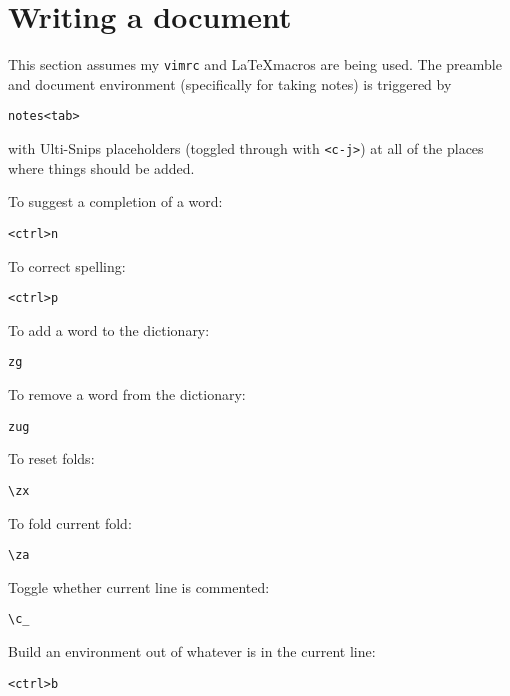 \documentclass{amsart}
\begin{document}
\section{Writing a document}

This section assumes my \texttt{vimrc} and \LaTeX macros are being used.
The preamble and document environment (specifically for taking notes) is triggered by
\begin{verbatim}
notes<tab>
\end{verbatim}
with Ulti-Snips placeholders (toggled through with \texttt{<c-j>}) 
at all of the places where things should be added. 

To suggest a completion of a word:
\begin{verbatim}
<ctrl>n
\end{verbatim}

To correct spelling:
\begin{verbatim}
<ctrl>p
\end{verbatim}

To add a word to the dictionary:
\begin{verbatim}
zg
\end{verbatim}

To remove a word from the dictionary:
\begin{verbatim}
zug
\end{verbatim}

To reset folds:
\begin{verbatim}
\zx 
\end{verbatim}

To fold current fold:
\begin{verbatim}
\za
\end{verbatim}

Toggle whether current line is commented:
\begin{verbatim}
\c_
\end{verbatim}

Build an environment out of whatever is in the current line:
\begin{verbatim}
<ctrl>b
\end{verbatim}
\end{document}
